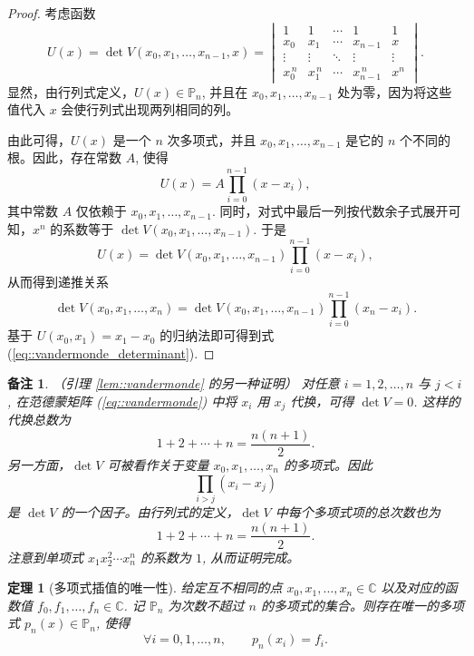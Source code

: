 \documentclass[a4paper]{ctexart}
\newtheorem{theorem}{定理}
\newtheorem{remark}{备注}
\numberwithin{theorem}{section}
\numberwithin{equation}{section}
\numberwithin{figure}{section}
\numberwithin{remark}{section}
\begin{document}
\begin{proof}
考虑函数
\begin{equation}
U(x)=\det V(x_0,x_1,\dots,x_{n-1},x)
=\begin{vmatrix}
1 & 1 & \cdots & 1 & 1\\
x_0 & x_1 & \cdots & x_{n-1} & x\\
\vdots & \vdots & \ddots & \vdots & \vdots\\
x_0^{\,n} & x_1^{\,n} & \cdots & x_{n-1}^{\,n} & x^{n}
\end{vmatrix}.
\end{equation}
显然，由行列式定义，$U(x)\in \mathbb{P}_n$, 并且在 $x_0,x_1,\ldots,x_{n-1}$ 处为零，因为将这些值代入 $x$ 会使行列式出现两列相同的列。

由此可得，$U(x)$ 是一个 $n$ 次多项式，并且 $x_0,x_1,\ldots,x_{n-1}$ 是它的 $n$ 个不同的根。因此，存在常数 $A$, 使得
\begin{equation*}
U(x)=A\prod_{i=0}^{n-1}(x-x_i),
\end{equation*}
其中常数 $A$ 仅依赖于 $x_0,x_1,\ldots,x_{n-1}$. 同时，对式中最后一列按代数余子式展开可知，$x^{n}$ 的系数等于 $\det V(x_0,x_1,\ldots,x_{n-1})$. 
于是
\begin{equation*}
U(x)=\det V(x_0,x_1,\ldots,x_{n-1})\prod_{i=0}^{n-1}(x-x_i),
\end{equation*}
从而得到递推关系
\begin{equation*}
\det V(x_0,x_1,\ldots,x_n)=\det V(x_0,x_1,\ldots,x_{n-1})\prod_{i=0}^{n-1}(x_n-x_i).
\end{equation*}
基于 $U(x_0,x_1)=x_1-x_0$ 的归纳法即可得到式 (\ref{eq::vandermonde_determinant}).
\end{proof}

\begin{remark}
（引理 \ref{lem::vandermonde} 的另一种证明）
对任意 $i=1,2,\ldots,n$ 与 $j<i$, 在范德蒙矩阵 (\ref{eq::vandermonde}) 中将 $x_i$ 用 $x_j$ 代换，可得 $\det V=0$. 
这样的代换总数为
\[
1+2+\cdots+n=\frac{n(n+1)}{2}.
\]
另一方面，$\det V$ 可被看作关于变量 $x_0,x_1,\ldots,x_n$ 的多项式。因此
\[
\prod_{i>j}(x_i-x_j)
\]
是 $\det V$ 的一个因子。由行列式的定义，$\det V$ 中每个多项式项的总次数也为
\[
1+2+\cdots+n=\frac{n(n+1)}{2}.
\]
注意到单项式 $x_1 x_2^{2}\cdots x_n^{n}$ 的系数为 $1$, 从而证明完成。
\end{remark}

\begin{theorem}[多项式插值的唯一性]
    \label{thm::polynomial_interpolation}
给定互不相同的点 $x_0,x_1,\ldots,x_n\in\mathbb{C}$ 以及对应的函数值 $f_0,f_1,\ldots,f_n\in\mathbb{C}$. 
记 $\mathbb{P}_n$ 为次数不超过 $n$ 的多项式的集合。则存在唯一的多项式 $p_n(x)\in\mathbb{P}_n$, 使得
\begin{equation}
    \label{eq::vandermonde_polynomial}
\forall i=0,1,\ldots,n,\qquad p_n(x_i)=f_i.
\end{equation}
\end{theorem}
\end{document}
